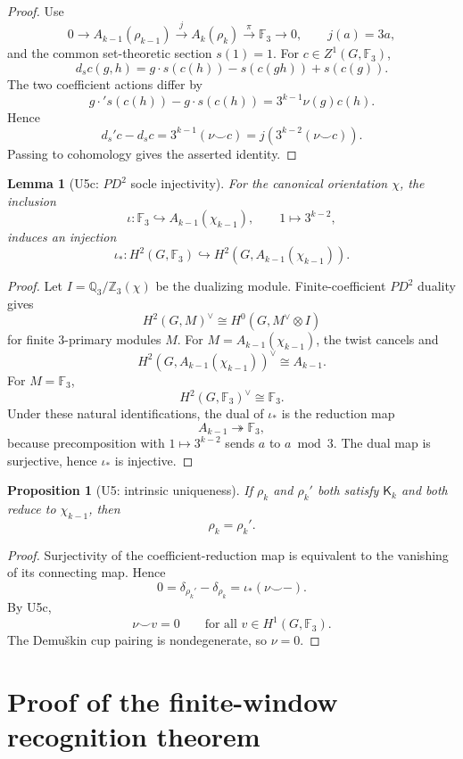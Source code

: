 \documentclass[11pt]{article}
\newtheorem{proposition}[theorem]{Proposition}
\newtheorem{lemma}[theorem]{Lemma}
\begin{document}
\begin{proof}
Use
\[
0\to A_{k-1}(\rho_{k-1})
\xrightarrow{j}A_k(\rho_k)
\xrightarrow{\pi}\mathbb F_3\to0,
\qquad j(a)=3a,
\]
and the common set-theoretic section $s(1)=1$.
For $c\in Z^1(G,\mathbb F_3)$,
\[
d_sc(g,h)=g\!\cdot s(c(h))-s(c(gh))+s(c(g)).
\]
The two coefficient actions differ by
\[
g\!\cdot' s(c(h))-g\!\cdot s(c(h))
=3^{k-1}\nu(g)c(h).
\]
Hence
\[
d_s'c-d_sc
=
3^{k-1}(\nu\smile c)
=
j\!\left(3^{k-2}(\nu\smile c)\right).
\]
Passing to cohomology gives the asserted identity.
\end{proof}

\begin{lemma}[U5c: $PD^2$ socle injectivity]
For the canonical orientation $\chi$, the inclusion
\[
\iota:\mathbb F_3\hookrightarrow A_{k-1}(\chi_{k-1}),
\qquad 1\mapsto3^{k-2},
\]
induces an injection
\[
\iota_*:
H^2(G,\mathbb F_3)
\hookrightarrow
H^2(G,A_{k-1}(\chi_{k-1})).
\]
\end{lemma}

\begin{proof}
Let $I=\mathbb Q_3/\mathbb Z_3(\chi)$ be the dualizing module.
Finite-coefficient $PD^2$ duality gives
\[
H^2(G,M)^\vee
\cong
H^0(G,M^\vee\otimes I)
\]
for finite $3$-primary modules $M$. For
$M=A_{k-1}(\chi_{k-1})$, the twist cancels and
\[
H^2(G,A_{k-1}(\chi_{k-1}))^\vee\cong A_{k-1}.
\]
For $M=\mathbb F_3$,
\[
H^2(G,\mathbb F_3)^\vee\cong\mathbb F_3.
\]
Under these natural identifications, the dual of $\iota_*$ is the
reduction map
\[
A_{k-1}\twoheadrightarrow\mathbb F_3,
\]
because precomposition with $1\mapsto3^{k-2}$ sends $a$ to $a\bmod3$.
The dual map is surjective, hence $\iota_*$ is injective.
\end{proof}

\begin{proposition}[U5: intrinsic uniqueness]
If $\rho_k$ and $\rho_k'$ both satisfy $\mathsf K_k$ and both reduce to
$\chi_{k-1}$, then
\[
\rho_k=\rho_k'.
\]
\end{proposition}

\begin{proof}
Surjectivity of the coefficient-reduction map is equivalent to the
vanishing of its connecting map. Hence
\[
0=\delta_{\rho_k'}-\delta_{\rho_k}
=\iota_*(\nu\smile-).
\]
By U5c,
\[
\nu\smile v=0
\qquad\text{for all }v\in H^1(G,\mathbb F_3).
\]
The Demu\v{s}kin cup pairing is nondegenerate, so $\nu=0$.
\end{proof}

\section{Proof of the finite-window recognition theorem}
\end{document}
